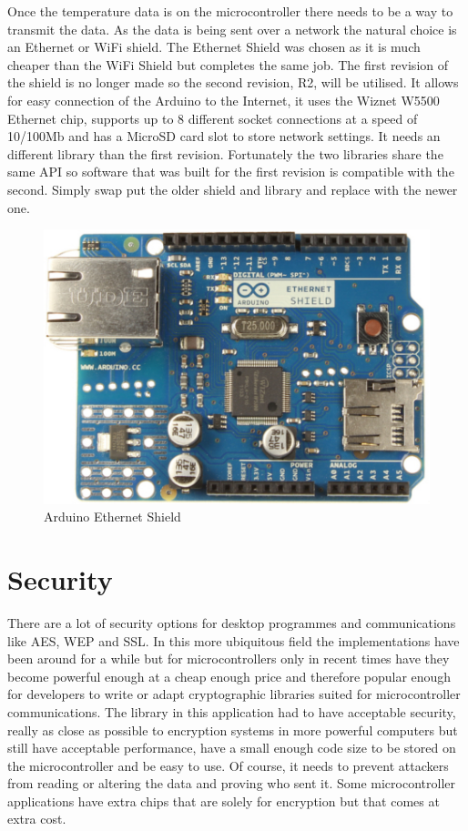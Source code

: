Once the temperature data is on the microcontroller there needs to be a way to transmit the data. As the data is being sent over a network the natural choice is an Ethernet or WiFi shield. The Ethernet Shield was chosen as it is much cheaper than the WiFi Shield but completes the same job. The first revision of the shield is no longer made so the second revision, R2, will be utilised. It allows for easy connection of the Arduino to the Internet, it uses the Wiznet W5500 Ethernet chip, supports up to 8 different socket connections at a speed of 10/100Mb and has a MicroSD card slot to store network settings. It needs an different library than the first revision\cite{eth2}. Fortunately the two libraries share the same API so software that was built for the first revision is compatible with the second. Simply swap put the older shield and library and replace with the newer one.

\begin{figure}[H]
	\centering
	\includegraphics[width=.4\linewidth]{Figures/ethernet.jpg}
	\caption{Arduino Ethernet Shield}
	\label{fig:eth}
\end{figure}

\section{Security}

There are a lot of security options for desktop programmes and communications like AES, WEP and SSL. In this more ubiquitous field the implementations have been around for a while but for microcontrollers only in recent times have they become powerful enough at a cheap enough price and therefore popular enough for developers to write or adapt cryptographic libraries suited for microcontroller communications. The library in this application had to have acceptable security, really as close as possible to encryption systems in more powerful computers but still have acceptable performance, have a small enough code size to be stored on the microcontroller and be easy to use. Of course, it needs to prevent attackers from reading or altering the data and proving who sent it. Some microcontroller applications have extra chips that are solely for encryption but that comes at extra cost.

